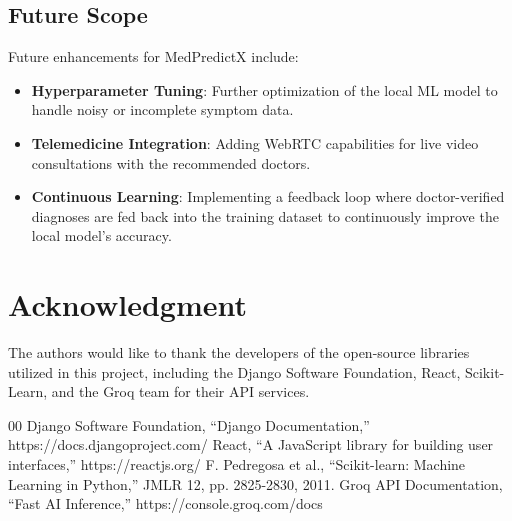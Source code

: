 \documentclass[conference]{IEEEtran}
\begin{document}
\subsection{Future Scope}
Future enhancements for MedPredictX include:
\begin{itemize}
    \item \textbf{Hyperparameter Tuning}: Further optimization of the local ML model to handle noisy or incomplete symptom data.
    \item \textbf{Telemedicine Integration}: Adding WebRTC capabilities for live video consultations with the recommended doctors.
    \item \textbf{Continuous Learning}: Implementing a feedback loop where doctor-verified diagnoses are fed back into the training dataset to continuously improve the local model's accuracy.
\end{itemize}

\section*{Acknowledgment}
The authors would like to thank the developers of the open-source libraries utilized in this project, including the Django Software Foundation, React, Scikit-Learn, and the Groq team for their API services.

\begin{thebibliography}{00}
 Django Software Foundation, ``Django Documentation,'' https://docs.djangoproject.com/
 React, ``A JavaScript library for building user interfaces,'' https://reactjs.org/
 F. Pedregosa et al., ``Scikit-learn: Machine Learning in Python,'' JMLR 12, pp. 2825-2830, 2011.
 Groq API Documentation, ``Fast AI Inference,'' https://console.groq.com/docs
\end{thebibliography}
\end{document}
